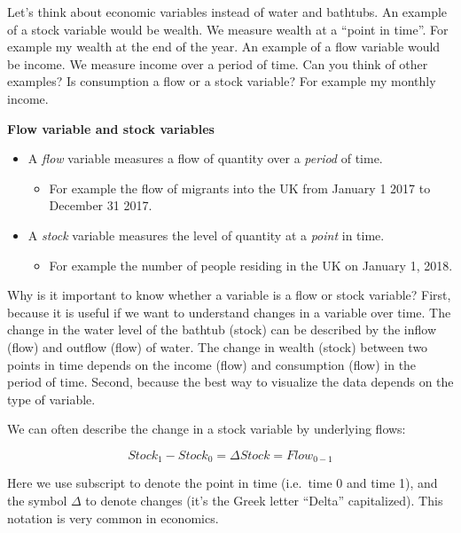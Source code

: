 \documentclass[
]{book}
\providecommand{\tightlist}{%
  \setlength{\itemsep}{0pt}\setlength{\parskip}{0pt}}
\begin{document}
Let's think about economic variables instead of water and bathtubs. An example of a stock variable would be wealth. We measure wealth at a ``point in time''. For example my wealth at the end of the year. An example of a flow variable would be income. We measure income over a period of time. Can you think of other examples? Is consumption a flow or a stock variable? For example my monthly income.

\begin{myblock}
\textbf{Flow variable and stock variables}

\begin{itemize}
\tightlist
\item
  A \emph{flow} variable measures a flow of quantity over a
  \emph{period} of time.

  \begin{itemize}
  \tightlist
  \item
    For example the flow of migrants into the UK from January 1 2017 to
    December 31 2017.
  \end{itemize}
\item
  A \emph{stock} variable measures the level of quantity at a
  \emph{point} in time.

  \begin{itemize}
  \tightlist
  \item
    For example the number of people residing in the UK on January 1,
    2018.
  \end{itemize}
\end{itemize}
\end{myblock}

Why is it important to know whether a variable is a flow or stock variable? First, because it is useful if we want to understand changes in a variable over time. The change in the water level of the bathtub (stock) can be described by the inflow (flow) and outflow (flow) of water. The change in wealth (stock) between two points in time depends on the income (flow) and consumption (flow) in the period of time. Second, because the best way to visualize the data depends on the type of variable.

We can often describe the change in a stock variable by underlying flows:

\[ Stock_{1}-Stock_{0}=\Delta Stock=Flow_{0-1} \]

Here we use subscript to denote the point in time (i.e.~time 0 and time 1), and the symbol \(\Delta\) to denote changes (it's the Greek letter ``Delta'' capitalized). This notation is very common in economics.
\end{document}
